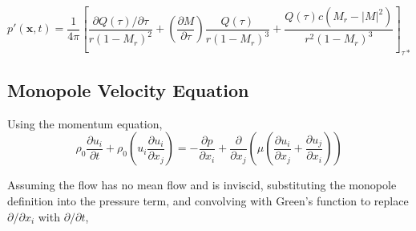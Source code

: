 
\begin{equation}
    p'(\bm{x}, t) = \frac{1}{4\pi} \left[ 
    \frac{\partial Q(\tau) / \partial \tau}{r(1-M_r)^2} +
    \left(\frac{\partial M}{\partial \tau} \right) \frac{Q(\tau)}{r(1-M_r)^3} +
    \frac{Q(\tau) c (M_r - |M|^2)}{r^2(1-M_r)^3}
    \right]_{\tau*}
    \label{eq:monopole_p_der}
\end{equation}

\subsection{Monopole Velocity Equation} \label{subsubsec:monopole_u}

Using the momentum equation,
\begin{equation}
    \rho_0 \frac{\partial u_i}{\partial t} +
    \rho_0 \left( u_i \frac{\partial u_i}{\partial x_j} \right) =
    -\frac{\partial p}{\partial x_i} +
    \frac{\partial}{\partial x_j} \left(
    \mu \left(\frac{\partial u_i}{\partial x_j} + \frac{\partial u_j}{\partial x_i} \right)
    \right)
    \label{eq:momentum_eq}
\end{equation}

Assuming the flow has no mean flow and is inviscid, substituting the monopole definition into the pressure term, and convolving with Green's function to replace $\partial/\partial x_i$ with $\partial/\partial t$, %




